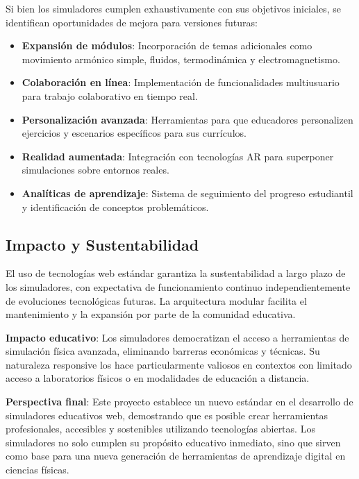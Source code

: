 Si bien los simuladores cumplen exhaustivamente con sus objetivos iniciales, se identifican oportunidades de mejora para versiones futuras:

\begin{itemize}
    \item \textbf{Expansión de módulos}: Incorporación de temas adicionales como movimiento armónico simple, fluidos, termodinámica y electromagnetismo.
    
    \item \textbf{Colaboración en línea}: Implementación de funcionalidades multiusuario para trabajo colaborativo en tiempo real.
    
    \item \textbf{Personalización avanzada}: Herramientas para que educadores personalizen ejercicios y escenarios específicos para sus currículos.
    
    \item \textbf{Realidad aumentada}: Integración con tecnologías AR para superponer simulaciones sobre entornos reales.
    
    \item \textbf{Analíticas de aprendizaje}: Sistema de seguimiento del progreso estudiantil y identificación de conceptos problemáticos.
\end{itemize}

\subsection{Impacto y Sustentabilidad}

El uso de tecnologías web estándar garantiza la sustentabilidad a largo plazo de los simuladores, con expectativa de funcionamiento continuo independientemente de evoluciones tecnológicas futuras. La arquitectura modular facilita el mantenimiento y la expansión por parte de la comunidad educativa.

\textbf{Impacto educativo}: Los simuladores democratizan el acceso a herramientas de simulación física avanzada, eliminando barreras económicas y técnicas. Su naturaleza responsive los hace particularmente valiosos en contextos con limitado acceso a laboratorios físicos o en modalidades de educación a distancia.

\textbf{Perspectiva final}: Este proyecto establece un nuevo estándar en el desarrollo de simuladores educativos web, demostrando que es posible crear herramientas profesionales, accesibles y sostenibles utilizando tecnologías abiertas. Los simuladores no solo cumplen su propósito educativo inmediato, sino que sirven como base para una nueva generación de herramientas de aprendizaje digital en ciencias físicas.